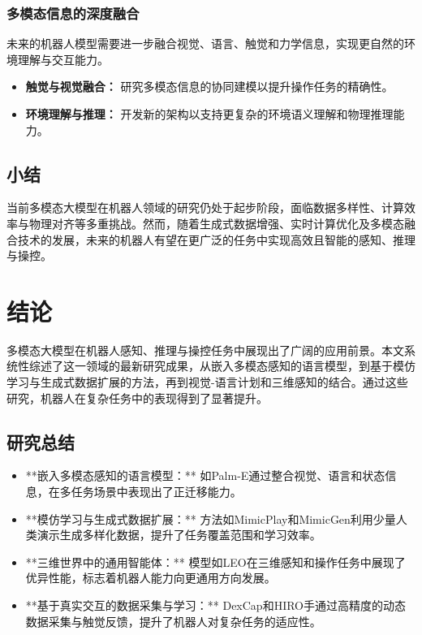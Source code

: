 \documentclass[a4paper]{article}
\begin{document}
\subsubsection{多模态信息的深度融合}
未来的机器人模型需要进一步融合视觉、语言、触觉和力学信息，实现更自然的环境理解与交互能力\cite{wang2024dexcap, wei2024wearable}。
\begin{itemize}
    \item \textbf{触觉与视觉融合：} 研究多模态信息的协同建模以提升操作任务的精确性。
    \item \textbf{环境理解与推理：} 开发新的架构以支持更复杂的环境语义理解和物理推理能力。
\end{itemize}

\subsection{小结}
当前多模态大模型在机器人领域的研究仍处于起步阶段，面临数据多样性、计算效率与物理对齐等多重挑战。然而，随着生成式数据增强、实时计算优化及多模态融合技术的发展，未来的机器人有望在更广泛的任务中实现高效且智能的感知、推理与操控\cite{chi2024universal, wang2023robogen, wei2024wearable}。


\section{结论}

多模态大模型在机器人感知、推理与操控任务中展现出了广阔的应用前景。本文系统性综述了这一领域的最新研究成果，从嵌入多模态感知的语言模型，到基于模仿学习与生成式数据扩展的方法，再到视觉-语言计划和三维感知的结合。通过这些研究，机器人在复杂任务中的表现得到了显著提升。

\subsection{研究总结}
\begin{itemize}
    \item **嵌入多模态感知的语言模型：** 如Palm-E通过整合视觉、语言和状态信息，在多任务场景中表现出了正迁移能力\cite{driess2023palm}。
    \item **模仿学习与生成式数据扩展：** 方法如MimicPlay和MimicGen利用少量人类演示生成多样化数据，提升了任务覆盖范围和学习效率\cite{wang2023mimicplay, mandlekar2023mimicgen}。
    \item **三维世界中的通用智能体：** 模型如LEO在三维感知和操作任务中展现了优异性能，标志着机器人能力向更通用方向发展\cite{huang2023embodied}。
    \item **基于真实交互的数据采集与学习：** DexCap和HIRO手通过高精度的动态数据采集与触觉反馈，提升了机器人对复杂任务的适应性\cite{wang2024dexcap, wei2024wearable}。
\end{itemize}
\end{document}
